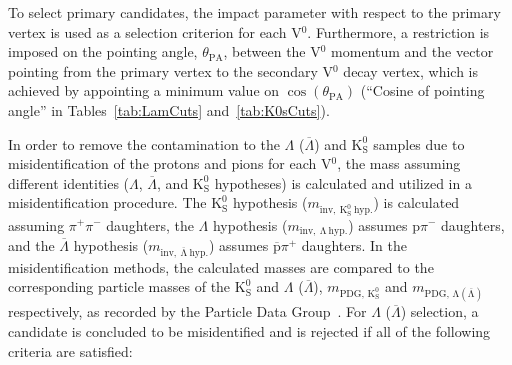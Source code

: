 \documentclass[ALICE,manyauthors]{cernphprep}
\newcommand{\Lam}{$\Lambda$\xspace}
\newcommand{\ALam}{$\overline{\Lambda}$\xspace}
\newcommand{\LamALam}{$\Lambda$ ($\overline{\Lambda}$)\xspace}
\newcommand{\Ks}{$\mathrm{K^{0}_{S}}$\xspace}
\newcommand{\Vz}{V$^{0}$\xspace}
\begin{document}
To select primary candidates, the impact parameter with respect to the primary vertex is used as a selection criterion for each \Vz.
Furthermore, a restriction is imposed on the pointing angle, $\theta_{\mathrm{PA}}$, between the \Vz momentum and the vector pointing from the primary vertex to the secondary \Vz decay vertex, which is achieved by appointing a minimum value on $\cos(\theta_{\mathrm{PA}})$ (``Cosine of pointing angle'' in Tables~\ref{tab:LamCuts} and~\ref{tab:K0sCuts}).

\begin{comment}
In order to remove the contamination to the \LamALam and \Ks samples due to misidentification of the protons and pions for each \Vz, the mass assuming different identities (\Lam, \ALam, \Ks)\footnote[1]
{
For the misidentification cuts, the mass assuming \Ks hypothesis ($m_{\mathrm{inv,~ K^{0}_{S}~ hyp.}}$) is calculated assuming $\pi^{+}\pi^{-}$ daughters, the mass assuming \Lam hypothesis ($m_{\mathrm{inv,~ \Lambda~ hyp.}}$) is calculated assuming p$\pi^{-}$ daughters, and the mass assuming \ALam hypothesis ($m_{\mathrm{inv,~ \overline{\Lambda}~ hyp.}}$) is calculated assuming $\overline{\mathrm{p}}\pi^{+}$ daughters. 
Additionally, $m_{\mathrm{PDG,\,K^{0}_{S}}}$ and $m_{\mathrm{PDG,\,\Lambda(\overline{\Lambda})}}$ denote the particle masses of the \Ks and \LamALam, respectively, as recorded by the Particle Data Group~\cite{PhysRevD.98.030001}.
}
is calculated and utilized in a set of misidentification cuts.
For \LamALam selection, a candidate is assumed to be misidentified and is rejected if all of the following criteria are satisfied:
\end{comment}

In order to remove the contamination to the \LamALam and \Ks samples due to misidentification of the protons and pions for each \Vz, the mass assuming different identities (\Lam, \ALam, and \Ks hypotheses) is calculated and utilized in a misidentification procedure.
The \Ks hypothesis ($m_{\mathrm{inv,~ K^{0}_{S}~ hyp.}}$) is calculated assuming $\pi^{+}\pi^{-}$ daughters, the \Lam hypothesis ($m_{\mathrm{inv,~ \Lambda~ hyp.}}$) assumes p$\pi^{-}$ daughters, and the \ALam hypothesis ($m_{\mathrm{inv,~ \overline{\Lambda}~ hyp.}}$) assumes $\overline{\mathrm{p}}\pi^{+}$ daughters. 
In the misidentification methods, the calculated masses are compared to the corresponding particle masses of the \Ks and \LamALam, $m_{\mathrm{PDG,\,K^{0}_{S}}}$ and $m_{\mathrm{PDG,\,\Lambda(\overline{\Lambda})}}$ respectively, as recorded by the Particle Data Group~\cite{PhysRevD.98.030001}.
For \LamALam selection, a candidate is concluded to be misidentified and is rejected if all of the following criteria are satisfied:
\end{document}
